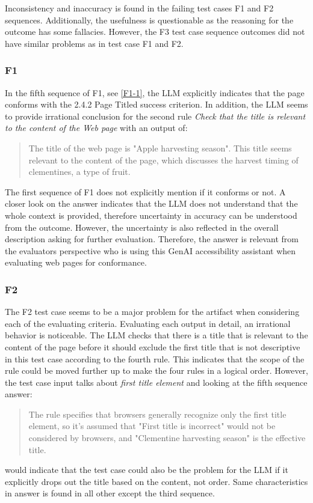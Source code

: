 Inconsistency and inaccuracy is found in the failing test cases F1 and F2 sequences. Additionally, the usefulness is questionable as the reasoning for the outcome has some fallacies. However, the F3 test case sequence outcomes did not have similar problems as in test case F1 and F2.

\subsubsection{F1}

In the fifth sequence of F1, see \ref{F1-1}, the LLM explicitly indicates that the page conforms with the 2.4.2 Page Titled success criterion. In addition, the LLM seems to provide irrational conclusion for the second rule \textit{Check that the title is relevant to the content of the Web page} with an output of:

\blockquote{
    The title of the web page is "Apple harvesting season". This title seems relevant to the content of the page, which discusses the harvest timing of clementines, a type of fruit.
}

The first sequence of F1 does not explicitly mention if it conforms or not. A closer look on the answer indicates that the LLM does not understand that the whole context is provided, therefore uncertainty in accuracy can be understood from the outcome. However, the uncertainty is also reflected in the overall description asking for further evaluation. Therefore, the answer is relevant from the evaluators perspective who is using this GenAI accessibility assistant when evaluating web pages for conformance.

\subsubsection{F2}

The F2 test case seems to be a major problem for the artifact when considering each of the evaluating criteria. Evaluating each output in detail, an irrational behavior is noticeable. The LLM checks that there is a title that is relevant to the content of the page before it should exclude the first title that is not descriptive in this test case according to the fourth rule. This indicates that the scope of the rule could be moved further up to make the four rules in a logical order. However, the test case input talks about \textit{first title element} and looking at the fifth sequence answer: \blockquote{The rule specifies that browsers generally recognize only the first title element, so it's assumed that "First title is incorrect" would not be considered by browsers, and "Clementine harvesting season" is the effective title.} would indicate that the test case could also be the problem for the LLM if it explicitly drops out the title based on the content, not order. Same characteristics in answer is found in all other except the third sequence.

